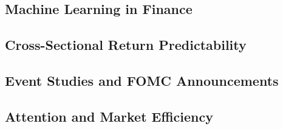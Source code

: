 
\subsection{Machine Learning in Finance}

\subsection{Cross-Sectional Return Predictability}

\subsection{Event Studies and FOMC Announcements}

\subsection{Attention and Market Efficiency}

